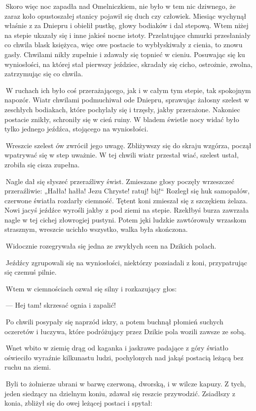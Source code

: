  Skoro więc noc zapadła nad Omelniczkiem, nie było w tem nic dziwnego, że zaraz koło opustoszałej stanicy pojawił się duch czy człowiek. Miesiąc wychynął właśnie z za Dniepru i obielił pustkę, głowy bodiaków i dal stepową. Wtem niżej na stepie ukazały się i inne jakieś nocne istoty. Przelatujące chmurki przesłaniały co chwila blask księżyca, więc owe postacie to wybłyskiwały z cienia, to znowu gasły. Chwilami nikły zupełnie i zdawały się topnieć w cieniu. Posuwając się ku wyniosłości, na której stał pierwszy jeździec, skradały się cicho, ostrożnie, zwolna, zatrzymując się co chwila.

 W ruchach ich było coś przerażającego, jak i w całym tym stepie, tak spokojnym napozór. Wiatr chwilami podmuchiwał ode Dniepru, sprawując żałosny szelest w zeschłych bodiakach, które pochylały się i trzęsły, jakby przerażone. Nakoniec postacie znikły, schroniły się w cień ruiny. W bladem świetle nocy widać było tylko jednego jeźdźca, stojącego na wyniosłości.

 Wreszcie szelest ów zwrócił jego uwagę. Zbliżywszy się do skraju wzgórza, począł wpatrywać się w step uważnie. W tej chwili wiatr przestał wiać, szelest ustał, zrobiła się cisza zupełna.

 Nagle dał się słyszeć przeraźliwy świst. Zmieszane głosy poczęły wrzeszczeć przeraźliwie: „Hałła! hałła! Jezu Chryste! ratuj! bij!“ Rozległ się huk samopałów, czerwone światła rozdarły ciemność. Tętent koni zmieszał się z szczękiem żelaza. Nowi jacyś jeźdźce wyrośli jakby z pod ziemi na stepie. Rzekłbyś burza zawrzała nagle w tej cichej złowrogiej pustyni. Potem jęki ludzkie zawtórowały wrzaskom strasznym, wreszcie ucichło wszystko, walka była skończona.

 Widocznie rozegrywała się jedna ze zwykłych scen na Dzikich polach.

 Jeźdźcy zgrupowali się na wyniosłości, niektórzy pozsiadali z koni, przypatrując się czemuś pilnie.

 Wtem w ciemnościach ozwał się silny i rozkazujący głos:

 — Hej tam! skrzesać ognia i zapalić!

 Po chwili posypały się naprzód iskry, a potem buchnął płomień suchych oczeretów i łuczywa, które podróżujący przez Dzikie pola wozili zawsze ze sobą.

 Wnet wbito w ziemię drąg od kaganka i jaskrawe padające z góry światło oświeciło wyraźnie kilkunastu ludzi, pochylonych nad jakąś postacią leżącą bez ruchu na ziemi.

 Byli to żołnierze ubrani w barwę czerwoną, dworską, i w wilcze kapuzy. Z tych, jeden siedzący na dzielnym koniu, zdawał się reszcie przywodzić. Zsiadłszy z konia, zbliżył się do owej leżącej postaci i spytał:

